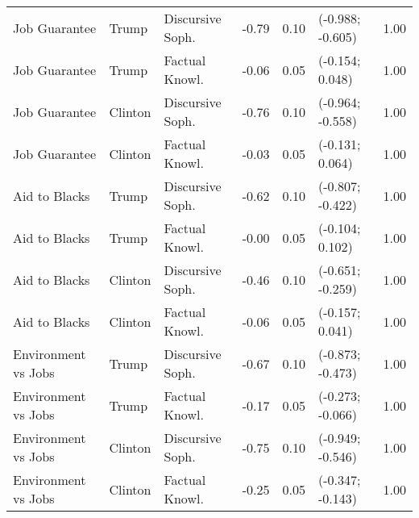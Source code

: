 \begin{table}[ht]
\begin{tabular}{lllrrlr}
  Job Guarantee & Trump & Discursive Soph. & -0.79 & 0.10 & (-0.988; -0.605) & 1.00 \\ 
  Job Guarantee & Trump & Factual Knowl. & -0.06 & 0.05 & (-0.154; 0.048) & 1.00 \\ 
  Job Guarantee & Clinton & Discursive Soph. & -0.76 & 0.10 & (-0.964; -0.558) & 1.00 \\ 
  Job Guarantee & Clinton & Factual Knowl. & -0.03 & 0.05 & (-0.131; 0.064) & 1.00 \\ 
  Aid to Blacks & Trump & Discursive Soph. & -0.62 & 0.10 & (-0.807; -0.422) & 1.00 \\ 
  Aid to Blacks & Trump & Factual Knowl. & -0.00 & 0.05 & (-0.104; 0.102) & 1.00 \\ 
  Aid to Blacks & Clinton & Discursive Soph. & -0.46 & 0.10 & (-0.651; -0.259) & 1.00 \\ 
  Aid to Blacks & Clinton & Factual Knowl. & -0.06 & 0.05 & (-0.157; 0.041) & 1.00 \\ 
  Environment vs Jobs & Trump & Discursive Soph. & -0.67 & 0.10 & (-0.873; -0.473) & 1.00 \\ 
  Environment vs Jobs & Trump & Factual Knowl. & -0.17 & 0.05 & (-0.273; -0.066) & 1.00 \\ 
  Environment vs Jobs & Clinton & Discursive Soph. & -0.75 & 0.10 & (-0.949; -0.546) & 1.00 \\ 
  Environment vs Jobs & Clinton & Factual Knowl. & -0.25 & 0.05 & (-0.347; -0.143) & 1.00 \\ 
   \hline
\end{tabular}
\end{table}
